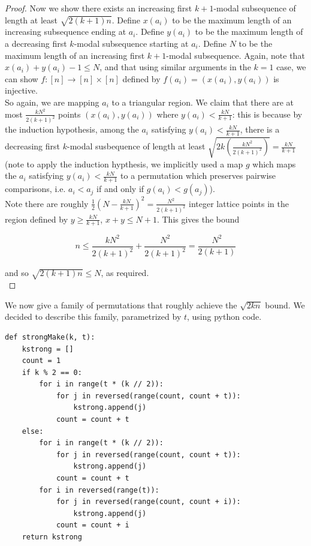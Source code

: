 \documentclass{article}
\begin{document}
\begin{proof}
Now we show there exists an increasing first $k+1$-modal subsequence of length at least $\sqrt{2(k+1)n}$. Define $x(a_i)$ to be the maximum length of an increasing subsequence ending at $a_i$. Define $y(a_i)$ to be the maximum length of a decreasing first $k$-modal subsequence starting at $a_i$. Define $N$ to be the maximum length of an increasing first $k+1$-modal subsequence. Again, note that $x(a_i) + y(a_i) - 1 \leq N$, and that using similar arguments in the $k = 1$ case, we can show $f : [n] \rightarrow [n] \times [n]$ defined by $f(a_i) = (x(a_i), y(a_i))$ is injective. \\

So again, we are mapping $a_i$ to a triangular region. We claim that there are at most $\frac{kN^2}{2(k+1)^2}$ points $(x(a_i), y(a_i))$ where $y(a_i) < \frac{kN}{k+1}$: this is because by the induction hypothesis, among the $a_i$ satisfying $y(a_i) < \frac{kN}{k+1}$, there is a decreasing first $k$-modal susbequence of length at least $\sqrt{2k (\frac{kN^2}{2(k+1)^2})} = \frac{kN}{k+1}$ (note to apply the induction hypthesis, we implicitly used a map $g$ which maps the $a_i$ satisfying $y(a_i) < \frac{kN}{k+1}$ to a permutation which preserves pairwise comparisons, i.e. $a_i < a_j$ if and only if $g(a_i) < g(a_j)$). \\

Note there are roughly $\frac{1}{2} (N - \frac{kN}{k+1})^2 = \frac{N^2}{2(k+1)^2}$ integer lattice points in the region defined by $y \geq \frac{kN}{k+1}$, $x+y \leq N+1$. This gives the bound

$$n \leq \frac{kN^2}{2(k+1)^2} + \frac{N^2}{2(k+1)^2} = \frac{N^2}{2(k+1)}$$

and so $\sqrt{2(k+1)n} \leq N$, as required. \\
\end{proof}

We now give a family of permutations that roughly achieve the $\sqrt{2kn}$ bound. We decided to describe this family, parametrized by $t$, using python code. \\

\begin{verbatim}
def strongMake(k, t):
    kstrong = []
    count = 1
    if k % 2 == 0:
        for i in range(t * (k // 2)):
            for j in reversed(range(count, count + t)):
                kstrong.append(j)
            count = count + t
    else:
        for i in range(t * (k // 2)):
            for j in reversed(range(count, count + t)):
                kstrong.append(j)
            count = count + t
        for i in reversed(range(t)):
            for j in reversed(range(count, count + i)):
                kstrong.append(j)
            count = count + i
    return kstrong
\end{verbatim}
\end{document}
